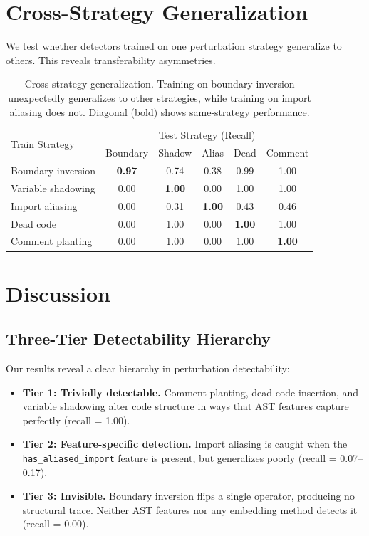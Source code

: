 \documentclass[11pt]{article}
\begin{document}
\section{Cross-Strategy Generalization}
\label{sec:generalization}

We test whether detectors trained on one perturbation strategy generalize to others. This reveals transferability asymmetries.

\begin{table}[h]
\centering
\begin{tabular}{@{}lccccc@{}}
\toprule
\multirow{2}{*}{Train Strategy} & \multicolumn{5}{c}{Test Strategy (Recall)} \\
& Boundary & Shadow & Alias & Dead & Comment \\
\midrule
Boundary inversion & \textbf{0.97} & 0.74 & 0.38 & 0.99 & 1.00 \\
Variable shadowing & 0.00 & \textbf{1.00} & 0.00 & 1.00 & 1.00 \\
Import aliasing & 0.00 & 0.31 & \textbf{1.00} & 0.43 & 0.46 \\
Dead code & 0.00 & 1.00 & 0.00 & \textbf{1.00} & 1.00 \\
Comment planting & 0.00 & 1.00 & 0.00 & 1.00 & \textbf{1.00} \\
\bottomrule
\end{tabular}
\caption{Cross-strategy generalization. Training on boundary inversion unexpectedly generalizes to other strategies, while training on import aliasing does not. Diagonal (bold) shows same-strategy performance.}
\label{tab:generalization}
\end{table}

\section{Discussion}
\label{sec:discussion}

\subsection{Three-Tier Detectability Hierarchy}

Our results reveal a clear hierarchy in perturbation detectability:

\begin{itemize}
    \item \textbf{Tier 1: Trivially detectable.} Comment planting, dead code insertion, and variable shadowing alter code structure in ways that AST features capture perfectly (recall = 1.00).
    \item \textbf{Tier 2: Feature-specific detection.} Import aliasing is caught when the \texttt{has\_aliased\_import} feature is present, but generalizes poorly (recall = 0.07--0.17).
    \item \textbf{Tier 3: Invisible.} Boundary inversion flips a single operator, producing no structural trace. Neither AST features nor any embedding method detects it (recall = 0.00).
\end{itemize}
\end{document}
